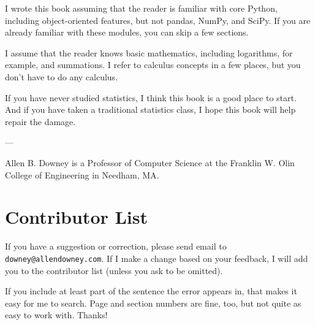 \documentclass[12pt]{book}
\begin{document}
I wrote this book assuming that the reader is familiar with core Python,
including object-oriented features, but not pandas,
NumPy, and SciPy.  If you are already familiar with these modules, you
can skip a few sections.

I assume that the reader knows basic mathematics, including
logarithms, for example, and summations.  I refer to calculus concepts
in a few places, but you don't have to do any calculus.

If you have never studied statistics, I think this book is a good place
to start.  And if you have taken
a traditional statistics class, I hope this book will help repair the
damage.



---

Allen B. Downey is a Professor of Computer Science at 
the Franklin W. Olin College of Engineering in Needham, MA.




\section*{Contributor List}

If you have a suggestion or correction, please send email to 
{\tt downey@allendowney.com}.  If I make a change based on your
feedback, I will add you to the contributor list
(unless you ask to be omitted).

If you include at least part of the sentence the
error appears in, that makes it easy for me to search.  Page and
section numbers are fine, too, but not quite as easy to work with.
Thanks!

\small
\end{document}
